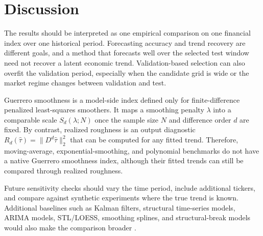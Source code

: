 \section{Discussion}
The results should be interpreted as one empirical comparison on one financial
index over one historical period. Forecasting accuracy and trend recovery are
different goals, and a method that forecasts well over the selected test window
need not recover a latent economic trend. Validation-based selection can also
overfit the validation period, especially when the candidate grid is wide or
the market regime changes between validation and test.

Guerrero smoothness is a model-side index defined only for finite-difference
penalized least-squares smoothers. It maps a smoothing penalty \(\lambda\) into
a comparable scale \(S_d(\lambda; N)\) once the sample size \(N\) and
difference order \(d\) are fixed. By contrast, realized roughness is an output
diagnostic \(R_d(\hat{\tau}) = \|D^d\hat{\tau}\|_2^2\) that can be computed for
any fitted trend. Therefore, moving-average, exponential-smoothing, and
polynomial benchmarks do not have a native Guerrero smoothness index, although
their fitted trends can still be compared through realized roughness.

Future sensitivity checks should vary the time period, include additional
tickers, and compare against synthetic experiments where the true trend is
known. Additional baselines such as Kalman filters, structural time-series
models, ARIMA models, STL/LOESS, smoothing splines, and structural-break models
would also make the comparison broader
\citep{kalman1960new,harvey1989structural,box2008time,cleveland1979lowess,
cleveland1990stl,wahba1990splines}.
